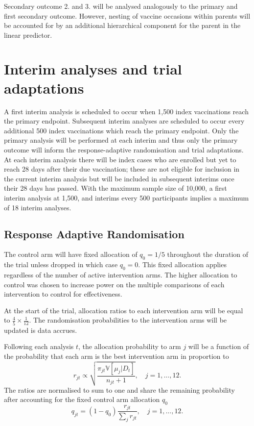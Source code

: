 \documentclass[
  bibliography=totoc]{scrreprt}
\begin{document}
Secondary outcome 2. and 3. will be analysed analogously to the primary and first secondary outcome.
However, nesting of vaccine occasions within parents will be accounted for by an additional hierarchical component for the parent in the linear predictor.

\hypertarget{interim-analyses-and-trial-adaptations}{%
\section{Interim analyses and trial adaptations}\label{interim-analyses-and-trial-adaptations}}

A first interim analysis is scheduled to occur when 1,500 index vaccinations reach the primary endpoint.
Subsequent interim analyses are scheduled to occur every additional 500 index vaccinations which reach the primary endpoint.
Only the primary analysis will be performed at each interim and thus only the primary outcome will inform the response-adaptive randomisation and trial adaptations.
At each interim analysis there will be index cases who are enrolled but yet to reach 28 days after their due vaccination; these are not eligible for inclusion in the current interim analysis but will be included in subsequent interims once their 28 days has passed.
With the maximum sample size of 10,000, a first interim analysis at 1,500, and interims every 500 participants implies a maximum of 18 interim analyses.

\hypertarget{response-adaptive-randomisation}{%
\subsection{Response Adaptive Randomisation}\label{response-adaptive-randomisation}}

The control arm will have fixed allocation of \(q_0=1/5\) throughout the duration of the trial unless dropped in which case \(q_0=0\).
This fixed allocation applies regardless of the number of active intervention arms.
The higher allocation to control was chosen to increase power on the multiple comparisons of each intervention to control for effectiveness.

At the start of the trial, allocation ratios to each intervention arm will be equal to \(\frac{4}{5}\times\frac{1}{12}\).
The randomisation probabilities to the intervention arms will be updated is data accrues.

Following each analysis \(t\), the allocation probability to arm \(j\) will be a function of the probability that each arm is the best intervention arm in proportion to
\[
r_{jt} \propto \sqrt{\frac{\pi_{jt}\mathbb V[\mu_j|D_t]}{n_{jt} + 1}},\quad j=1,...,12.
\]
The ratios are normalised to sum to one and share the remaining probability after accounting for the fixed control arm allocation \(q_0\)
\[
q_{jt} = (1 - q_0)\frac{r_{jt}}{\sum_j r_{jt}},\quad j=1,...,12.
\]
\end{document}
